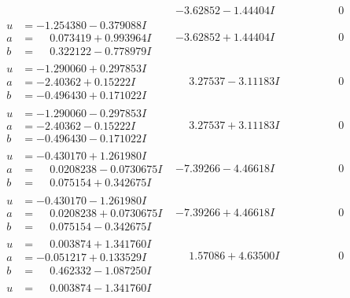 \documentclass[1p]{elsarticle_modified}
\theoremstyle{definition}
\begin{document}
$$\begin{array}{c|c|c}
 & -3.62852 - 1.44404 I & \phantom{-0.000000 } 0 \\ \hline\begin{aligned}
u &= -1.254380 - 0.379088 I \\
a &= \phantom{-}0.073419 + 0.993964 I \\
b &= \phantom{-}0.322122 - 0.778979 I\end{aligned}
 & -3.62852 + 1.44404 I & \phantom{-0.000000 } 0 \\ \hline\begin{aligned}
u &= -1.290060 + 0.297853 I \\
a &= -2.40362 + 0.15222 I \\
b &= -0.496430 + 0.171022 I\end{aligned}
 & \phantom{-}3.27537 - 3.11183 I & \phantom{-0.000000 } 0 \\ \hline\begin{aligned}
u &= -1.290060 - 0.297853 I \\
a &= -2.40362 - 0.15222 I \\
b &= -0.496430 - 0.171022 I\end{aligned}
 & \phantom{-}3.27537 + 3.11183 I & \phantom{-0.000000 } 0 \\ \hline\begin{aligned}
u &= -0.430170 + 1.261980 I \\
a &= \phantom{-}0.0208238 - 0.0730675 I \\
b &= \phantom{-}0.075154 + 0.342675 I\end{aligned}
 & -7.39266 - 4.46618 I & \phantom{-0.000000 } 0 \\ \hline\begin{aligned}
u &= -0.430170 - 1.261980 I \\
a &= \phantom{-}0.0208238 + 0.0730675 I \\
b &= \phantom{-}0.075154 - 0.342675 I\end{aligned}
 & -7.39266 + 4.46618 I & \phantom{-0.000000 } 0 \\ \hline\begin{aligned}
u &= \phantom{-}0.003874 + 1.341760 I \\
a &= -0.051217 + 0.133529 I \\
b &= \phantom{-}0.462332 - 1.087250 I\end{aligned}
 & \phantom{-}1.57086 + 4.63500 I & \phantom{-0.000000 } 0 \\ \hline\begin{aligned}
u &= \phantom{-}0.003874 - 1.341760 I \\

\end{aligned}
\end{array}$$
\end{document}
